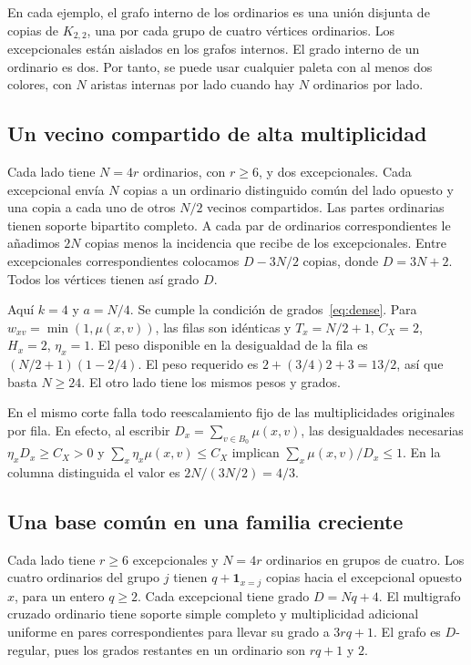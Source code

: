 \documentclass[11pt]{article}
\begin{document}
En cada ejemplo, el grafo interno de los ordinarios es una unión disjunta de copias de \(K_{2,2}\), una por cada grupo de cuatro vértices ordinarios. Los excepcionales están aislados en los grafos internos. El grado interno de un ordinario es dos. Por tanto, se puede usar cualquier paleta con al menos dos colores, con \(N\) aristas internas por lado cuando hay \(N\) ordinarios por lado.

\subsection{Un vecino compartido de alta multiplicidad}

Cada lado tiene \(N=4r\) ordinarios, con \(r\ge6\), y dos excepcionales. Cada excepcional envía \(N\) copias a un ordinario distinguido común del lado opuesto y una copia a cada uno de otros \(N/2\) vecinos compartidos. Las partes ordinarias tienen soporte bipartito completo. A cada par de ordinarios correspondientes le añadimos \(2N\) copias menos la incidencia que recibe de los excepcionales. Entre excepcionales correspondientes colocamos \(D-3N/2\) copias, donde \(D=3N+2\). Todos los vértices tienen así grado \(D\).

Aquí \(k=4\) y \(a=N/4\). Se cumple la condición de grados~\eqref{eq:dense}. Para \(w_{xv}=\min(1,\mu(x,v))\), las filas son idénticas y \(T_x=N/2+1\), \(C_X=2\), \(H_x=2\), \(\eta_x=1\). El peso disponible en la desigualdad de la fila es \((N/2+1)(1-2/4)\). El peso requerido es \(2+(3/4)2+3=13/2\), así que basta \(N\ge24\). El otro lado tiene los mismos pesos y grados.

En el mismo corte falla todo reescalamiento fijo de las multiplicidades originales por fila. En efecto, al escribir \(D_x=\sum_{v\in B_0}\mu(x,v)\), las desigualdades necesarias \(\eta_xD_x\ge C_X>0\) y \(\sum_x\eta_x\mu(x,v)\le C_X\) implican \(\sum_x\mu(x,v)/D_x\le1\). En la columna distinguida el valor es \(2N/(3N/2)=4/3\).

\subsection{Una base común en una familia creciente}

Cada lado tiene \(r\ge6\) excepcionales y \(N=4r\) ordinarios en grupos de cuatro. Los cuatro ordinarios del grupo \(j\) tienen \(q+\mathbf1_{x=j}\) copias hacia el excepcional opuesto \(x\), para un entero \(q\ge2\). Cada excepcional tiene grado \(D=Nq+4\). El multigrafo cruzado ordinario tiene soporte simple completo y multiplicidad adicional uniforme en pares correspondientes para llevar su grado a \(3rq+1\). El grafo es \(D\)-regular, pues los grados restantes en un ordinario son \(rq+1\) y \(2\).
\end{document}
